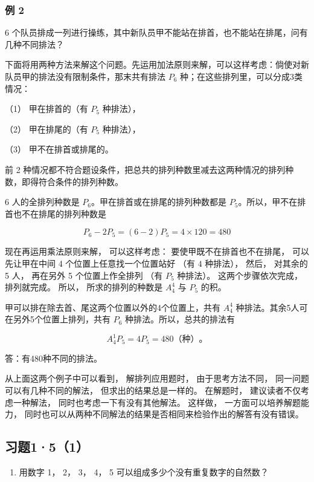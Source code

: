 \subsubsection{例 2}

6
个队员排成一列进行操练，其中新队员甲不能站在排首，也不能站在排尾，问有几种不同排法？

下面将用两种方法来解这个问题。先运用加法原则来解，可以这样考虑：倘使对新队员甲的排法没有限制条件，那末共有排法
\(P_{6}\) 种；在这些排列里，可以分成3类情况：

（1） 甲在排首的（有 \(P_{5}\) 种排法），

（2） 甲在排尾的（有 \(P_{5}\) 种排法），

（3） 甲不在排首或排尾的。

前 2
种情况都不符合题设条件，把总共的排列种数里减去这两种情况的排列种数，即得符合条件的排列种数。

 6 人的全排列种数是
\(P_{6}\)。甲在排首或在排尾的排列种数都是
\(P_{5}\)。所以，甲不在排首也不在排尾的排列种数是

\[
P _ {6} - 2 P _ {5} = (6 - 2) P _ {5} = 4 \times 120 = 480
\]

现在再运用乘法原则来解， 可以这样考虑： 要使甲既不在排首也不在排尾，
可以先让甲在中间 4 个位置上任意找一个位置站好 （有 \(4\) 种排法），
然后， 对其余的 5 人， 再在另外 5 个位置上作全排列 （有 \(P_{5}\)
种排法）。 这两个步骤依次完成， 排列就完成。 所以， 所求的排列的种数是
\(A_{4}^{4}\) 与 \(P_{5}\) 的积。


甲可以排在除去首、尾这两个位置以外的4个位置上，共有 \(A_{4}^{4}\)
种排法。其余5人可在另外5个位置上排列，共有 \(P_{6}\)
种排法。所以，总共的排法有

\[
A_4^1P_5=4P_5=480\text{（种）}\text{。}
\]

答：有480种不同的排法。

从上面这两个例子中可以看到， 解排列应用题时， 由于思考方法不同，
同一问题可以有几种不同的解法， 但求出的结果总是一样的。 在解题时，
建议读者不仅考虑一种解法， 同时也考虑一下有没有其他解法。 这样做，
一方面可以培养解题能力，
同时也可以从两种不同解法的结果是否相同来检验作出的解答有没有错误。

\subsection{习题1·5（1）}

\begin{enumerate}
\item
  用数字 1， 2， 3， 4， 5 可以组成多少个没有重复数字的自然数？
\end{enumerate}

